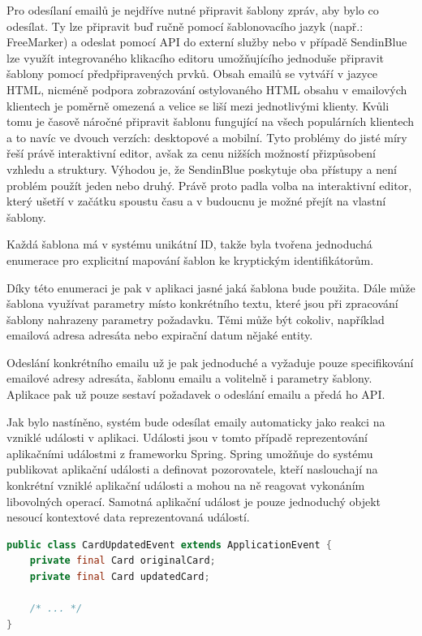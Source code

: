 		Pro odesílaní emailů je nejdříve nutné připravit šablony zpráv, aby bylo co odesílat.
		Ty lze připravit buď ručně pomocí šablonovacího jazyk (např.: FreeMarker) a odeslat pomocí \ac{API} do externí
		služby nebo v případě SendinBlue lze využít integrovaného klikacího editoru umožňujícího jednoduše připravit
		šablony pomocí předpřipravených prvků.
		Obsah emailů se vytváří v jazyce \ac{HTML}, nicméně podpora zobrazování ostylovaného \ac{HTML} obsahu v
		emailových klientech je poměrně omezená a velice se liší mezi jednotlivými klienty.
		Kvůli tomu je časově náročné připravit šablonu fungující na všech populárních klientech a to navíc ve dvouch
		verzích: desktopové a mobilní.
		Tyto problémy do jisté míry řeší právě interaktivní editor, avšak za cenu nižších možností přizpůsobení vzhledu
		a struktury.
		Výhodou je, že SendinBlue poskytuje oba přístupy a není problém použít jeden nebo druhý.
		Právě proto padla volba na interaktivní editor, který ušetří v začátku spoustu času a v budoucnu je možné
		přejít na vlastní šablony.

		Každá šablona má v systému unikátní ID, takže byla tvořena jednoduchá enumerace pro explicitní mapování
		šablon ke kryptickým identifikátorům.

		Díky této enumeraci je pak v aplikaci jasné jaká šablona bude použita.
		Dále může šablona využívat parametry místo konkrétního textu, které jsou při zpracování šablony nahrazeny
		parametry požadavku.
		Těmi může být cokoliv, například emailová adresa adresáta nebo expirační datum nějaké entity.

		Odeslání konkrétního emailu už je pak jednoduché a vyžaduje pouze specifikování emailové adresy adresáta,
		šablonu emailu a volitelně i parametry šablony.
		Aplikace pak už pouze sestaví požadavek o odeslání emailu a předá ho \ac{API}.

		Jak bylo nastíněno, systém bude odesílat emaily automaticky jako reakci na vzniklé události v aplikaci.
		Události jsou v tomto případě reprezentování aplikačními událostmi z frameworku Spring.
		Spring umožňuje do systému publikovat aplikační události a definovat pozorovatele, kteří naslouchají na konkrétní
		vzniklé aplikační události a mohou na ně reagovat vykonáním libovolných operací.
		Samotná aplikační událost je pouze jednoduchý objekt nesoucí kontextové data reprezentovaná událostí.

		\begin{lstlisting}[language=Java, caption={Ukázka aplikační události. Zdroj: [autor]}]
public class CardUpdatedEvent extends ApplicationEvent {
    private final Card originalCard;
    private final Card updatedCard;

    /* ... */
}
		\end{lstlisting}

